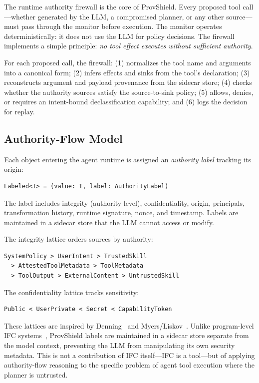 \documentclass[sigconf,anonymous,review]{acmart}
\begin{document}
The runtime authority firewall is the core of ProvShield. Every proposed tool call---whether generated by the LLM, a compromised planner, or any other source---must pass through the monitor before execution. The monitor operates deterministically: it does not use the LLM for policy decisions. The firewall implements a simple principle: \emph{no tool effect executes without sufficient authority}.

For each proposed call, the firewall: (1) normalizes the tool name and arguments into a canonical form; (2) infers effects and sinks from the tool's declaration; (3) reconstructs argument and payload provenance from the sidecar store; (4) checks whether the authority sources satisfy the source-to-sink policy; (5) allows, denies, or requires an intent-bound declassification capability; and (6) logs the decision for replay.

\subsection{Authority-Flow Model}
\label{sec:labels}

Each object entering the agent runtime is assigned an \emph{authority label} tracking its origin:
\begin{lstlisting}
Labeled<T> = (value: T, label: AuthorityLabel)
\end{lstlisting}

The label includes integrity (authority level), confidentiality, origin, principals, transformation history, runtime signature, nonce, and timestamp. Labels are maintained in a sidecar store that the LLM cannot access or modify.

The integrity lattice orders sources by authority:
\begin{lstlisting}
SystemPolicy > UserIntent > TrustedSkill
  > AttestedToolMetadata > ToolMetadata
  > ToolOutput > ExternalContent > UntrustedSkill
\end{lstlisting}

The confidentiality lattice tracks sensitivity:
\begin{lstlisting}
Public < UserPrivate < Secret < CapabilityToken
\end{lstlisting}

These lattices are inspired by Denning~\cite{denning1976lattice} and Myers/Liskov~\cite{myers1997decentralized}. Unlike program-level IFC systems~\cite{fides_agent_ifc}, ProvShield labels are maintained in a sidecar store separate from the model context, preventing the LLM from manipulating its own security metadata. This is not a contribution of IFC itself---IFC is a tool---but of applying authority-flow reasoning to the specific problem of agent tool execution where the planner is untrusted.
\end{document}
